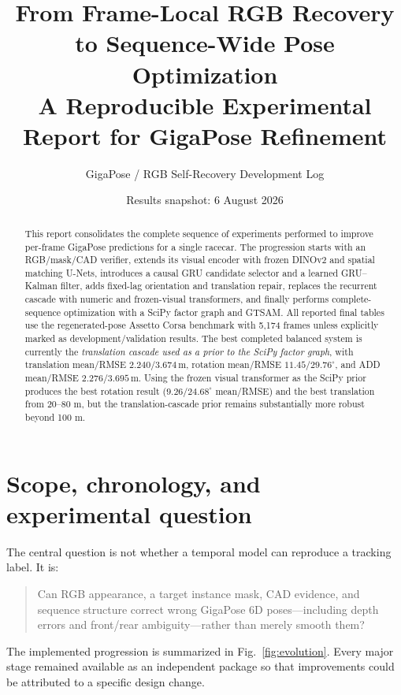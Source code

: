 \documentclass[11pt]{article}
\title{\textbf{From Frame-Local RGB Recovery to Sequence-Wide Pose Optimization}\\
\large A Reproducible Experimental Report for GigaPose Refinement}
\author{GigaPose / RGB Self-Recovery Development Log}
\date{Results snapshot: 6 August 2026}
\newcommand{\unitm}{\,\mathrm{m}}
\newcommand{\unitdeg}{^{\circ}}
\begin{document}
\maketitle

\begin{abstract}
This report consolidates the complete sequence of experiments performed to improve per-frame GigaPose predictions for a single racecar.  The progression starts with an RGB/mask/CAD verifier, extends its visual encoder with frozen DINOv2 and spatial matching U-Nets, introduces a causal GRU candidate selector and a learned GRU--Kalman filter, adds fixed-lag orientation and translation repair, replaces the recurrent cascade with numeric and frozen-visual transformers, and finally performs complete-sequence optimization with a SciPy factor graph and GTSAM.  All reported final tables use the regenerated-pose Assetto Corsa benchmark with 5,174 frames unless explicitly marked as development/validation results.  The best completed balanced system is currently the \emph{translation cascade used as a prior to the SciPy factor graph}, with translation mean/RMSE $2.240/3.674\unitm$, rotation mean/RMSE $11.45/29.76\unitdeg$, and ADD mean/RMSE $2.276/3.695\unitm$.  Using the frozen visual transformer as the SciPy prior produces the best rotation result ($9.26/24.68\unitdeg$ mean/RMSE) and the best translation from 20--80 m, but the translation-cascade prior remains substantially more robust beyond 100 m.
\end{abstract}

\tableofcontents
\newpage

\section{Scope, chronology, and experimental question}

The central question is not whether a temporal model can reproduce a tracking label.  It is:
\begin{quote}
Can RGB appearance, a target instance mask, CAD evidence, and sequence structure correct wrong GigaPose 6D poses---including depth errors and front/rear ambiguity---rather than merely smooth them?
\end{quote}

The implemented progression is summarized in Fig.~\ref{fig:evolution}.  Every major stage remained available as an independent package so that improvements could be attributed to a specific design change.
\end{document}

